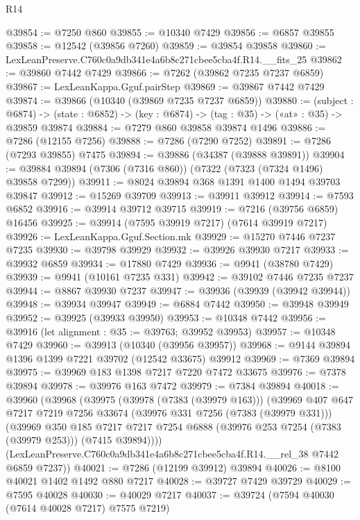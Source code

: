\begin{lexlean}{R14}
\begin{coremodule}
@39854 := @7250 @860
@39855 := @10340 @7429
@39856 := @6857 @39855
@39858 := @12542 (@39856 @7260)
@39859 := @39854 @39858
@39860 := LexLeanPreserve.C760c0a9db341e4a6b8c271cbee5cba4f.R14.__fits_25
@39862 := @39860 @7442 @7429
@39866 := @7262 (@39862 @7235 @7237 @6859)
@39867 := LexLeanKappa.Gguf.pairStep
@39869 := @39867 @7442 @7429
@39874 := @39866 (@10340 (@39869 @7235 @7237 @6859))
@39880 := (subject : @6874) ->
  (state : @6852) -> (key : @6874) -> (tag : @35) -> («at» : @35) -> @39859 @39874
@39884 := @7279 @860 @39858 @39874 @1496
@39886 := @7286 (@12155 @7256)
@39888 := @7286 (@7290 @7252)
@39891 := @7286 (@7293 @39855) @7475
@39894 := @39886 (@34387 (@39888 @39891))
@39904 := @39884 @39894 (@7306 (@7316 @860)) (@7322 (@7323 (@7324 @1496) @39858 @7299))
@39911 := @8024 @39894 @368 @1391 @1400 @1494 @39703 @39847
@39912 := @15269 @39709
@39913 := @39911 @39912
@39914 := @7593 @6852
@39916 := @39914 @39712 @39715
@39919 := @7216 (@39756 @6859) @16456
@39925 := @39914 (@7595 @39919 @7217) (@7614 @39919 @7217)
@39926 := LexLeanKappa.Gguf.Section.mk
@39929 := @15270 @7446 @7237 @7235
@39930 := @39798 @39929
@39932 := @39926 @39930 @7217
@39933 := @39932 @6859
@39934 := @17880 @7429
@39936 := @9941 (@38780 @7429)
@39939 := @9941 (@10161 @7235 @331)
@39942 := @39102 @7446 @7235 @7237
@39944 := @8867 @39930 @7237
@39947 := @39936 (@39939 (@39942 @39944))
@39948 := @39934 @39947
@39949 := @6884 @7442
@39950 := @39948 @39949
@39952 := @39925 (@39933 @39950)
@39953 := @10348 @7442
@39956 := @39916 (let alignment : @35 := @39763; @39952 @39953)
@39957 := @10348 @7429
@39960 := @39913 (@10340 (@39956 @39957))
@39968 := @9144 @39894 @1396 @1399 @7221 @39702 (@12542 @33675) @39912
@39969 := @7369 @39894
@39975 := @39969 @183 @1398 @7217 @7220 @7472 @33675
@39976 := @7378 @39894
@39978 := @39976 @163 @7472
@39979 := @7384 @39894
@40018 := @39960
    (@39968
      (@39975
        (@39978 (@7383 (@39979 @163)))
        (@39969
          @407
          @647
          @7217
          @7219
          @7256
          @33674
          (@39976 @331 @7256 (@7383 (@39979 @331)))
          (@39969
            @350
            @185
            @7217
            @7217
            @7254
            @6888
            (@39976 @253 @7254 (@7383 (@39979 @253)))
            (@7415 @39894))))
      (LexLeanPreserve.C760c0a9db341e4a6b8c271cbee5cba4f.R14.__rel_38 @7442 @6859 @7237))
@40021 := @7286 (@12199 @39912) @39894
@40026 := @8100 @40021 @1402 @1492 @880 @7217
@40028 := @39727 @7429 @39729
@40029 := @7595 @40028
@40030 := @40029 @7217
@40037 := @39724 (@7594 @40030 (@7614 @40028 @7217) @7575 @7219)

\end{coremodule}
\end{lexlean}
